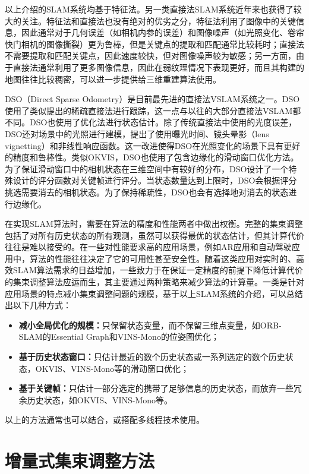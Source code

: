 以上介绍的SLAM系统均基于特征法。另一类直接法SLAM系统近年来也获得了较大的关注。特征法和直接法也没有绝对的优劣之分，特征法利用了图像中的关键信息，因此通常对于几何误差（如相机内参的误差）和图像噪声（如光照变化、卷帘快门相机的图像撕裂）更为鲁棒，但是关键点的提取和匹配通常比较耗时；直接法不需要提取和匹配关键点，因此速度较快，但对图像噪声较为敏感；另一方面，由于直接法通常利用了更多图像信息，因此在弱纹理情况下表现更好，而且其构建的地图往往比较稠密，可以进一步提供给三维重建算法使用。

DSO（Direct Sparse Odometry）\citep{engel2018direct}是目前最先进的直接法VSLAM系统之一。DSO使用了类似\citep{jin2003semi}提出的稀疏直接法进行跟踪，这一点与以往的大部分直接法VSLAM都不同。DSO也使用了优化法进行状态估计。除了传统直接法中使用的光度误差，DSO还对场景中的光照进行建模，提出了使用曝光时间、镜头晕影（lens vignetting）和非线性响应函数。这一改进使得DSO在光照变化的场景下具有更好的精度和鲁棒性。类似OKVIS，DSO也使用了包含边缘化的滑动窗口优化方法。为了保证滑动窗口中的相机状态在三维空间中有较好的分布，DSO设计了一个特殊设计的评分函数对关键帧进行评分。当状态数量达到上限时，DSO会根据评分挑选需要消去的相机状态。为了保持稀疏性，DSO也会有选择地对消去的状态进行边缘化。

在实现SLAM算法时，需要在算法的精度和性能两者中做出权衡。完整的集束调整包括了对所有历史状态的所有观测，虽然可以获得最优的状态估计，但其计算代价往往是难以接受的。在一些对性能要求高的应用场景，例如AR应用和自动驾驶应用中，算法的性能往往决定了它的可用性甚至安全性。随着这类应用对实时的、高效SLAM算法需求的日益增加，一些致力于在保证一定精度的前提下降低计算代价的集束调整算法应运而生，其主要通过两种策略来减少算法的计算量。一类是针对应用场景的特点减小集束调整问题的规模，基于以上SLAM系统的介绍，可以总结出以下几种方式：
\begin{itemize}
    \item \textbf{减小全局优化的规模：}只保留状态变量，而不保留三维点变量，如ORB-SLAM的Essential Graph和VINS-Mono的位姿图优化；
    \item \textbf{基于历史状态窗口：}只估计最近的数个历史状态或一系列选定的数个历史状态，OKVIS、VINS-Mono等的滑动窗口优化；
    \item \textbf{基于关键帧：}只估计一部分选定的携带了足够信息的历史状态，而放弃一些冗余历史状态，如OKVIS、VINS-Mono等。
\end{itemize}
以上的方法通常也可以结合，或搭配多线程技术使用。

\section{增量式集束调整方法}

